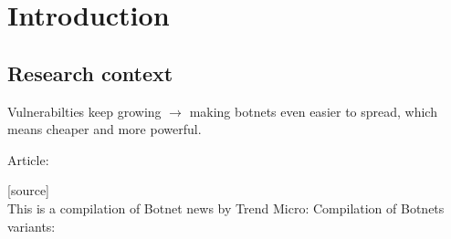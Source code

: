 
\chapter{Introduction} %

\label{Introduction} %


\newcommand{\keyword}[1]{\textbf{#1}}
\newcommand{\tabhead}[1]{\textbf{#1}}
\newcommand{\code}[1]{\texttt{#1}}
\newcommand{\file}[1]{\texttt{\bfseries#1}}
\newcommand{\option}[1]{\texttt{\itshape#1}}

\section{Research context}
Vulnerabilties keep growing $\rightarrow$ making botnets even easier to spread, which means cheaper and more powerful.

Article: %

[source]\\
This is a compilation of Botnet news by Trend Micro: %
Compilation of Botnets variants: %
